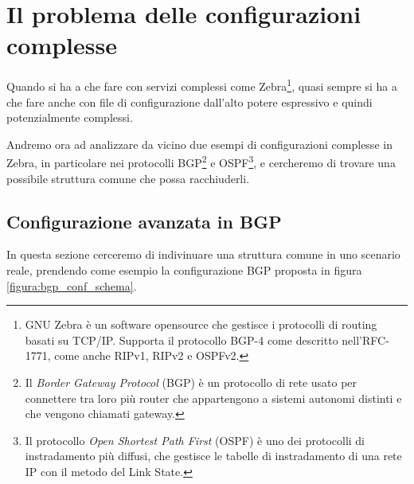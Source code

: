\section{Il problema delle configurazioni complesse}
Quando si ha a che fare con servizi complessi come Zebra\footnote{GNU Zebra è un software opensource che gestisce i protocolli di routing basati su TCP/IP. Supporta il protocollo BGP-4 come descritto nell'RFC-1771, come anche RIPv1, RIPv2 e OSPFv2.}, quasi sempre si ha a che fare anche con file di configurazione dall'alto potere espressivo e quindi potenzialmente complessi.

Andremo ora ad analizzare da vicino due esempi di configurazioni complesse in Zebra, in particolare nei protocolli BGP\footnote{Il \emph{Border Gateway Protocol} (BGP) è un protocollo di rete usato per connettere tra loro più router che appartengono a sistemi autonomi distinti e che vengono chiamati gateway.} e OSPF\footnote{Il protocollo \emph{Open Shortest Path First} (OSPF) è uno dei protocolli di instradamento più diffusi, che gestisce le tabelle di instradamento di una rete IP con il metodo del Link State.}, e cercheremo di trovare una possibile struttura comune che possa racchiuderli.

\subsection{Configurazione avanzata in BGP}
In questa sezione cerceremo di indivinuare una struttura comune in uno scenario reale, prendendo come esempio la configurazione BGP proposta in figura \ref{figura:bgp_conf_schema}.

